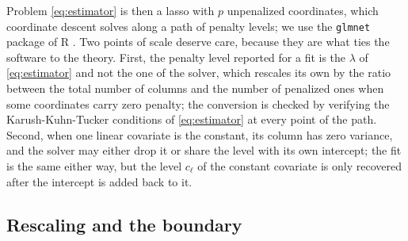 \documentclass[12pt]{article} %
\theoremstyle{definition}
\newcommand{\cv}{\ell}
\newcommand{\lvl}[1]{c_{#1}}
\newcommand{\pen}{\lambda}
\begin{document}
Problem \eqref{eq:estimator} is then a lasso with $p$ unpenalized coordinates,
which coordinate descent solves along a path of penalty levels; we use the
\texttt{glmnet} package\textcolor{colR1}{ \citep{friedman2010regularization} of R
\citep{RCoreTeam-2026}}. Two points of scale deserve care, because they are
what ties the software to the theory. First, the penalty level reported for a
fit is the $\pen$ of \eqref{eq:estimator} and not the one of the solver, which
rescales its own by the ratio between the total number of columns and the
number of penalized ones when some coordinates carry zero penalty; the
conversion is checked by verifying the Karush-Kuhn-Tucker conditions of
\eqref{eq:estimator} at every point of the path. Second, when one linear
covariate is the constant, its column has zero variance, and the solver may
either drop it or share the level with its own intercept; the fit is the same
either way, but the level $\lvl{\cv}$ of the constant covariate is only
recovered after the intercept is added back to it.

\subsection{Rescaling and the boundary}
\label{sec:boundary}
\end{document}

